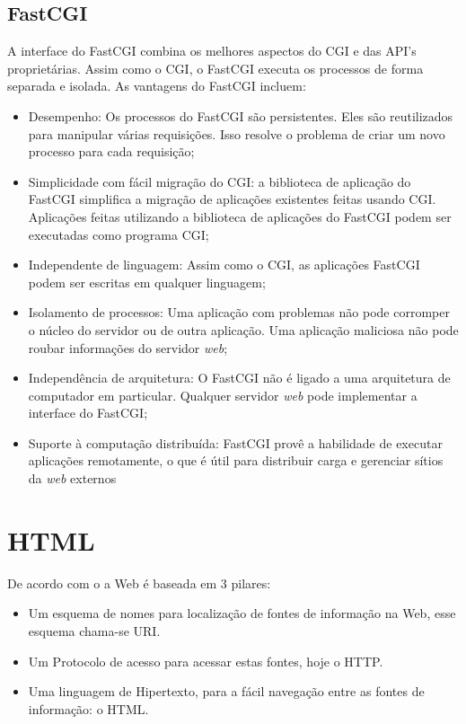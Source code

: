 \subsection{FastCGI}
A interface do FastCGI combina os melhores aspectos do CGI e das API's proprietárias. Assim como o CGI, o FastCGI executa os processos de forma separada e isolada. As vantagens do FastCGI incluem:
\begin{itemize}
	\item Desempenho: Os processos do FastCGI são persistentes. Eles são reutilizados para manipular várias requisições. Isso resolve o problema de criar um novo processo para cada requisição;
	\item Simplicidade com fácil migração do CGI: a biblioteca de aplicação do FastCGI simplifica a migração de aplicações existentes feitas usando CGI. Aplicações feitas utilizando a biblioteca de aplicações do FastCGI podem ser executadas como programa CGI;
	\item Independente de linguagem: Assim como o CGI, as aplicações FastCGI podem ser escritas em qualquer linguagem;
	\item Isolamento de processos: Uma aplicação com problemas não pode corromper o núcleo do servidor ou de outra aplicação. Uma aplicação maliciosa não pode roubar informações do servidor \textit{web};
	\item Independência de arquitetura: O FastCGI não é ligado a uma arquitetura de computador em particular. Qualquer servidor \textit{web} pode implementar a interface do FastCGI;
	\item Suporte à computação distribuída: FastCGI provê a habilidade de executar aplicações remotamente, o que é útil para distribuir carga e gerenciar sítios da \textit{web} externos
\end{itemize}
\section{HTML}
De acordo com o  a Web é baseada em 3 pilares:
\begin{itemize}
\item Um esquema de nomes para localização de fontes de informação na Web, esse esquema chama-se URI.
\item Um Protocolo de acesso para acessar estas fontes, hoje o HTTP.
\item Uma linguagem de Hipertexto, para a fácil navegação entre as fontes de informação: o HTML.
\end{itemize}
